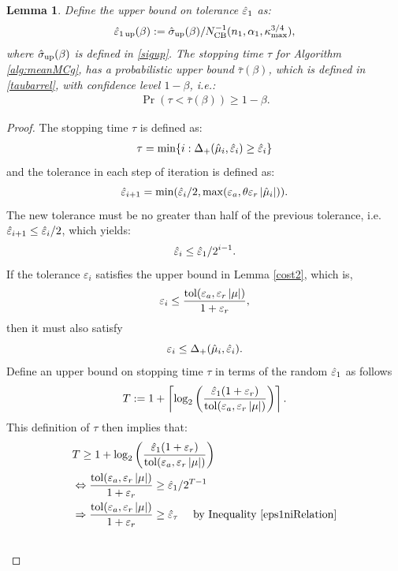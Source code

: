 \documentclass{iitthesis}
\newtheorem{lemma}[theorem]{Lemma}
\theoremstyle{definition}
\begin{document}
\begin{lemma}\label{tauprobbound}
Define the upper bound on tolerance $\hat{\varepsilon}_1$ as:
\begin{align}\label{eps1updef}
\hat{\varepsilon}_{1\operatorname{up}}(\beta):=\hat{\sigma}_{\operatorname{up}}(\beta)/N_{\text{CB}}^{-1}(n_1,\alpha_1,\kappa_{\max}^{3/4}),
\end{align}
where $\hat{\sigma}_{\operatorname{up}}(\beta)$ is defined in \eqref{sigup}. The stopping time $\tau$ for Algorithm \ref{alg:meanMCg}, has a probabilistic upper bound $\bar{\tau}(\beta)$, which is defined in \eqref{taubarrel}, with confidence level $1-\beta$, i.e.:
\begin{align}
\Pr(\tau <\bar{\tau}(\beta)) \geq 1-\beta.
\end{align}
\end{lemma}
\begin{proof}
The stopping time $\tau$ is defined as:
 \begin{align}\label{st}
\tau = \min \{ i: \Delta_{+}(\hat{\mu}_i, \hat{\varepsilon}_i) \geq \hat{\varepsilon}_i \}
\end{align}
 and the tolerance in each step of iteration is defined as:
 $$\hat{\varepsilon}_{i+1} = \min(\hat{\varepsilon}_i/2, \max(\varepsilon_a,\theta\varepsilon_r\left \lvert \hat{\mu}_i \right \rvert)).$$ 
The new tolerance must be no greater than half of the previous tolerance, i.e. $\hat{\varepsilon}_{i+1} \leq\hat{\varepsilon}_i/2$, which yields: 
\begin{align}\label{eps1niRelation}
\hat{\varepsilon}_i \le\hat{\varepsilon}_1/2^{i-1}.
\end{align} 
If the tolerance $\varepsilon_i$ satisfies the upper bound in Lemma \ref{cost2}, which is, $$\varepsilon_i \leq \frac{\operatorname{tol}(\varepsilon_a, \varepsilon_r\left \lvert \mu \right \rvert)}{1+\varepsilon_r},$$ then it must also satisfy
$$\varepsilon_i \leq \Delta_{+}(\hat{\mu}_i, \hat{\varepsilon}_i).$$ 
Define an upper bound on stopping time $\tau$ in terms of the random $\hat{\varepsilon}_1$ as follows
$$T := 1+\left \lceil \log_{2} \left(\frac{\hat{\varepsilon}_{1}(1+\varepsilon_r)}{ \operatorname{tol}(\varepsilon_a,\varepsilon_r \left \lvert \mu \right \rvert)}\right) \right \rceil. $$
This definition of $\tau$ then implies that:
\begin{align*}
& T \geq 1+\log_{2} \left(\frac{\heps_{1}(1+\varepsilon_r)}{ \tol(\varepsilon_a,\varepsilon_r \abs{\mu})}\right)\\&
\Leftrightarrow  \frac{\tol(\varepsilon_a, \varepsilon_r\abs{\mu})}{1+\varepsilon_r} \ge \heps_1/2^{T-1}\\
& \Rightarrow \frac{\tol(\varepsilon_a, \varepsilon_r\abs{\mu})}{1+\varepsilon_r} \ge \heps_\tau  \text{ \quad by Inequality \eqref{eps1niRelation}}\\&

\end{align*}
\end{proof}
\end{document}
